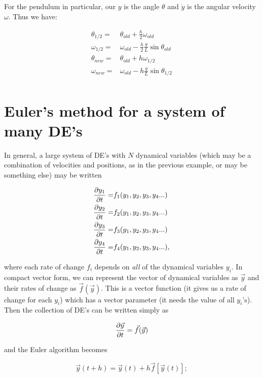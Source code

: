 \documentclass[12ampt]{article}
\def\PAR#1#2{ {{\partial #1}\over{\partial #2}} }
\begin{document}
For the pendulum in particular, our $y$ is the angle $\theta$ and $\dot y$ is the angular velocity $\omega$. Thus we have:

\begin{align*}
  \theta_{1/2} =& \theta_{old} + \frac{h}{2} \omega_{old} \\
  \omega_{1/2} =& \omega_{old} - \frac{h}{2} \frac{g}{L} \sin \theta_{old} \\
  \theta_{new} =& \theta_{old} + h \omega_{1/2} \\
  \omega_{new} =& \omega_{old} - h \frac{g}{L} \sin \theta_{1/2} \\
\end{align*}

  
\section{Euler's method for a system of many DE's}

In general, a large system of DE's with $N$ dynamical variables (which may be a combination of velocities and positions, as in the previous example, or may be something else) may be written

\begin{align*}
  \PAR{y_1}{t} =& f_1(y_1,y_2,y_3,y_4...)\\
  \PAR{y_2}{t} =& f_2(y_1,y_2,y_3,y_4...)\\
  \PAR{y_3}{t} =& f_3(y_1,y_2,y_3,y_4...)\\
  \PAR{y_4}{t} =& f_4(y_1,y_2,y_3,y_4...),
\end{align*}

where each rate of change $f_i$ depends on {\it all} of the dynamical variables $y_i$. In compact vector form, we can represent the vector of dynamical variables as $\vec y$ and their rates of change as $\vec f(\vec y)$. 
This is a vector function (it gives us a rate of change for each $y_i$) which has a vector parameter (it needs the value of all $y_i$'s). Then the collection of DE's can be written simply as 

\begin{equation}
  \PAR{\vec y}{t} = \vec f(\vec y)
\end{equation}

and the Euler algorithm becomes

\begin{equation}
  \vec y(t+h) = \vec y(t) + h \vec f\left[\vec y\left(t\right)\right];
\end{equation}
\end{document}
